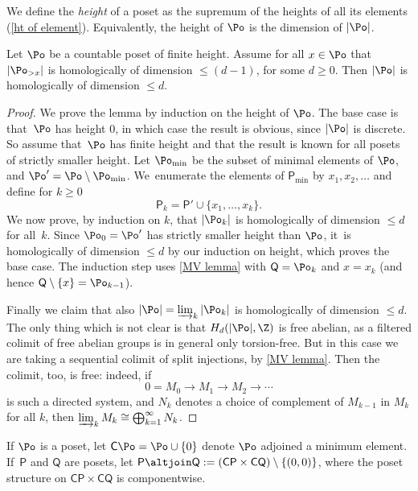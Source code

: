 \begin{defn}We define the \emph{height} of a poset as the supremum of the heights of all its elements (\cref{ht of element}). Equivalently, the height of $\Po$ is the dimension of $|\Po|$.
\end{defn}

\begin{lem}\label{dimension lemma}
	Let $\Po$ be a countable poset of finite height. Assume for all $x \in \Po$ that $|\Po_{>x}|$ is homologically of dimension $\leq (d-1)$, for some $d \geq 0$. Then $|\Po|$ is homologically of dimension $\leq d$.
\end{lem}

\begin{proof}We prove the lemma by induction on the height of $\Po$. The base case is that~$\Po$ has height $0$, in which case the result is obvious, since $|\Po|$ is discrete. So assume that~$\Po$ has finite height and that the result is known for all posets of strictly smaller height. Let $\Po_{\min}$ be the subset of minimal elements of $\Po$, and $\Po' = \Po \setminus \Po_{\min}$. We~enumerate the elements of $\mathsf P_{\min}$ by $x_1,x_2,\ldots$ and define for $k \geq 0$
\[
\mathsf P_k = \mathsf P' \cup \{x_1,\dots,x_k\}.
\]
We now prove, by induction on $k$, that $|\Po_k|$ is homologically of dimension $\leq d$ for all~$k$. Since $\Po_0=\Po'$ has strictly smaller height than $\Po$, it~is homologically of dimension $\leq d$ by our induction on height, which proves the base case. The induction step uses \cref{MV lemma} with $\mathsf Q= \Po_k$ and $x=x_k$ (and hence $\mathsf Q \setminus \{x\} = \Po_{k-1}$).

Finally we claim that also $|\Po| = \varinjlim_k |\Po_k|$ is homologically of dimension $\leq d$. The only thing which is not clear is that $H_d(|\Po|,\Z)$ is free abelian, as a filtered colimit of free abelian groups is in general only torsion-free. But in this case we are taking a sequential colimit of split injections, by \cref{MV lemma}. Then the colimit, too, is free: indeed, if
\[
0 = M_0 \to M_1 \to M_2 \to \cdots
\]
is such a directed system, and $N_k$ denotes a choice of complement of $M_{k-1}$ in $M_k$ for all $k$, then $\varinjlim_k M_k \cong \bigoplus_{k=1}^\infty N_k$. \end{proof}

\begin{notation}\label{notation:join}If $\Po$ is a poset, let $\mathsf C \Po = \Po \cup \{0\}$ denote $\Po$ adjoined a minimum element. If~$\mathsf P$ and $\mathsf Q$ are posets, let $\mathsf P \altjoin \mathsf Q := (\mathsf{CP} \times \mathsf{CQ}) \setminus \{(0,0)\}$, where the poset structure on $\mathsf{CP} \times \mathsf{CQ}$ is componentwise.
\end{notation}

